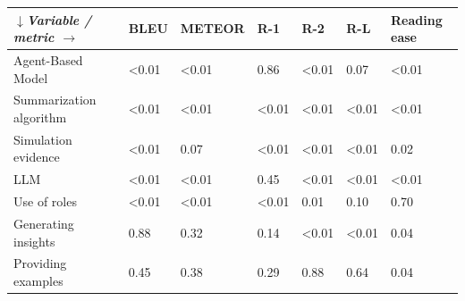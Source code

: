 \begin{tabular}{|l|l|l|l|l|l|l|}
\hline
\textit{$\downarrow$Variable / metric $\rightarrow$} & BLEU & METEOR & R-1 & R-2 & R-L & Reading ease \\
 \hline
 Agent-Based Model & \textless{}0.01 & \textless{}0.01 & 0.86 & \textless{}0.01 & 0.07 & \textless{}0.01 \\
 \hline
 Summarization algorithm & \textless{}0.01 & \textless{}0.01 & \textless{}0.01 & \textless{}0.01 & \textless{}0.01 & \textless{}0.01 \\
 \hline
 Simulation evidence & \textless{}0.01 & 0.07 & \textless{}0.01 & \textless{}0.01 & \textless{}0.01 & 0.02 \\
 \hline
 LLM & \textless{}0.01 & \textless{}0.01 & 0.45 & \textless{}0.01 & \textless{}0.01 & \textless{}0.01 \\
 \hline
 Use of roles & \textless{}0.01 & \textless{}0.01 & \textless{}0.01 & 0.01 & 0.10 & 0.70 \\
 \hline
 Generating insights & 0.88 & 0.32 & 0.14 & \textless{}0.01 & \textless{}0.01 & 0.04 \\
 \hline
 Providing examples & 0.45 & 0.38 & 0.29 & 0.88 & 0.64 & 0.04 \\
\hline
\end{tabular}
